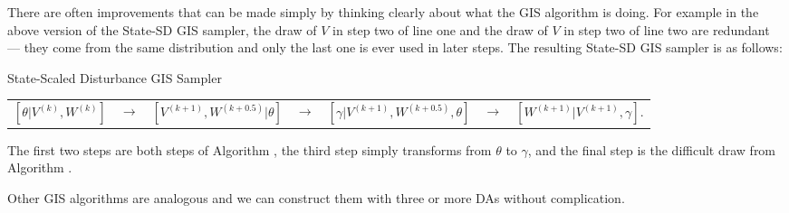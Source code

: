 \documentclass[12pt]{article}
\begin{document}
There are often improvements that can be made simply by thinking clearly about what the GIS algorithm is doing. For example in the above version of the State-SD GIS sampler, the draw of $V$ in step two of line one and the draw of $V$ in step two of line two are redundant --- they come from the same distribution and only the last one is ever used in later steps. The resulting State-SD GIS sampler is as follows:
\begin{alg*}State-Scaled Disturbance GIS Sampler
{\small \vspace{-.5cm}
\label{alg:DLMstateerror}
\begin{center}
\begin{tabular}{lllllll}
$[\theta|V^{(k)},W^{(k)}]$ & $\to$ & $[V^{(k+1)},W^{(k+0.5)}|\theta]$ & $\to$ & $[\gamma|V^{(k+1)},W^{(k+0.5)},\theta]$ & $\to$ & $[W^{(k+1)}|V^{(k+1)},\gamma]$.
\end{tabular}
\end{center}
}
\end{alg*}
\noindent
The first two steps are both steps of Algorithm , the third step simply transforms from $\theta$ to $\gamma$, and the final step is the difficult draw from Algorithm .

Other GIS algorithms are analogous and we can construct them with three or more DAs without complication. %
\end{document}
